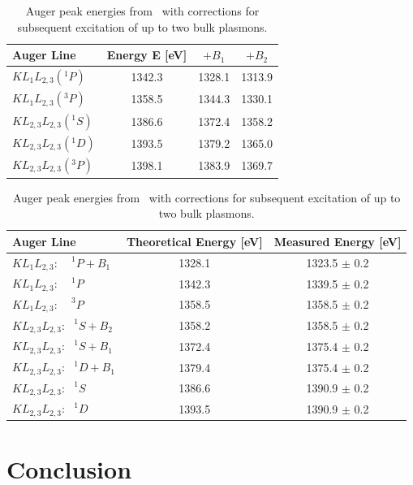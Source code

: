 \documentclass[a4paper,10pt]{scrartcl}
\begin{document}
\begin{table}
\begin{center}
\begin{tabular}{lccc}
\toprule
Auger Line                & Energy E [eV] & $+B_{1}$ & $+B_{2}$ \\
\midrule
$KL_{1}L_{2,3} (^{1}P)$   & 1342.3        & 1328.1   & 1313.9 \\
$KL_{1}L_{2,3} (^{3}P)$   & 1358.5        & 1344.3   & 1330.1 \\
$KL_{2,3}L_{2,3} (^{1}S)$ & 1386.6        & 1372.4   & 1358.2 \\
$KL_{2,3}L_{2,3} (^{1}D)$ & 1393.5        & 1379.2   & 1365.0 \\
$KL_{2,3}L_{2,3} (^{3}P)$ & 1398.1        & 1383.9   & 1369.7 \\
\bottomrule
\end{tabular}
\end{center}
\par
\caption{Auger peak energies from~\cite{augerpaper} with corrections for subsequent excitation of up to two bulk plasmons. \label{tab:augerpeakscomp}}
\end{table}

\begin{table}
\begin{center}
\begin{tabular}{lcc}
\toprule
Auger Line                                  & Theoretical Energy [eV] & Measured Energy [eV] \\
\midrule
$KL_{1}L_{2,3}: ~~\phantom{P}^{1}P + B_{1}$   & 1328.1                  & 1323.5 $\pm$ 0.2 \\
$KL_{1}L_{2,3}: ~~\phantom{P}^{1}P$           & 1342.3                  & 1339.5 $\pm$ 0.2 \\       
$KL_{1}L_{2,3}: ~~\phantom{P}^{3}P$           & 1358.5                  & 1358.5 $\pm$ 0.2 \\
$KL_{2,3}L_{2,3}: \phantom{P}^{1}S + B_{2}$ & 1358.2                  & 1358.5 $\pm$ 0.2 \\
$KL_{2,3}L_{2,3}: \phantom{P}^{1}S + B_{1}$ & 1372.4                  & 1375.4 $\pm$ 0.2 \\        
$KL_{2,3}L_{2,3}: \phantom{P}^{1}D + B_{1}$ & 1379.4                  & 1375.4 $\pm$ 0.2 \\
$KL_{2,3}L_{2,3}: \phantom{P}^{1}S$         & 1386.6                  & 1390.9 $\pm$ 0.2 \\        
$KL_{2,3}L_{2,3}: \phantom{P}^{1}D$         & 1393.5                  & 1390.9 $\pm$ 0.2 \\        
\bottomrule
\end{tabular}
\end{center}
\par
\caption{Auger peak energies from~\cite{augerpaper} with corrections for subsequent excitation of up to two bulk plasmons. \label{tab:identification}}
\end{table}


\section{Conclusion}

\nocite{skript}
\nocite{augerpaper}
\nocite{plasmonpaper}
\nocite{handbook}
\nocite{ben}



\end{document}
